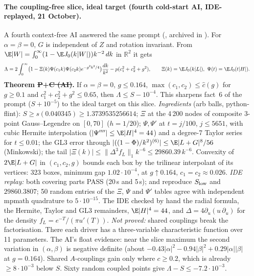 \paragraph{The coupling-free slice, ideal target (fourth cold-start AI, IDE-replayed, 21 October).} A fourth context-free AI answered the same prompt
(, archived in ). For $\alpha=\beta=0$, $G$ is
independent of $Z$ and rotation invariant. From $\E|W|=\int_0^\infty(1-\E J_0(k|W|))k^{-2}\,dk$ in $\mathbb R^2$ it gets
\[
\Lambda=2\int_0^\infty\bigl(1-\Xi(k)\Psi(c_1k)\Psi(c_2k)e^{-g^2k^2/4}\bigr)\frac{dk}{k^2}-p(c_1^2+c_2^2+g^2),\qquad
\Xi(k)=\E J_0(k|L|),\ \Psi(t)=\E J_0(t|H|).
\]
\textbf{Theorem \st{P}+\st{C (AI)}.} If $\alpha=\beta=0$, $g\le0.164$, $\max(c_1,c_2)\le\hat c(g)$ for $g\ge0.1$ and $c_1^2+c_2^2+g^2\le0.65$, then
$\Lambda\le S-10^{-4}$. This sharpens fact~6 of the prompt ($S+10^{-5}$) to the ideal target on this slice. \emph{Ingredients} (arb balls, python-flint):
$S\ge s(0.040345)\ge1.3739535256614$; $\Xi$ at the 4\,200 nodes of composite 3-point Gauss--Legendre on $[0,70]$ ($h=1/20$); $\Psi,\Psi'$ at $t=j/100$,
$j\le5651$, with cubic Hermite interpolation ($|\Psi''''|\le\E|H|^4=44$) and a degree-7 Taylor series for $t\le0.01$; the GL3 error through
$|((1-\Phi)/k^2)^{(6)}|\le\E|L+G|^8/56$ (Minkowski); the tail $|\Xi(k)|\le\|\Delta^3f_L\|_1k^{-6}\le29860.39\,k^{-6}$. Convexity of $2\E|L+G|$ in $(c_1,c_2,g)$
bounds each box by the trilinear interpolant of its vertices: 323 boxes, minimum gap $1.02\cdot10^{-4}$, at $g\uparrow0.164$, $c_1=c_2\approx0.026$.
\emph{IDE replay:} both covering parts PASS (20\,s and 5\,s);  and  reproduce $S_{\rm low}$ and $29860.3807$; 50 random entries of the $\Xi$, $\Psi$ and $\Psi'$ tables
agree with independent mpmath quadrature to $5\cdot10^{-15}$. The IDE checked by hand the radial formula, the Hermite, Taylor and GL3 remainders,
$\E|H|^4=44$, and $\Delta=4\partial_u(u\,\partial_u)$ for the density $f_L=e^{-T}/(\pi u'(T))$.
\emph{Not proved:} shared couplings break the factorisation. There each driver has a three-variable characteristic function over 11 parameters. The AI's float
evidence: near the slice maximum the second variation in $(\alpha,\beta)$ is negative definite (about $-0.43|\alpha|^2-0.94|\beta|^2+0.29|\alpha||\beta|$ at $g=0.164$). Shared $A$-couplings gain
only where $c\ge0.2$, which is already $\ge8\cdot10^{-3}$ below $S$. Sixty random coupled points give $\Lambda-S\le-7.2\cdot10^{-3}$.
